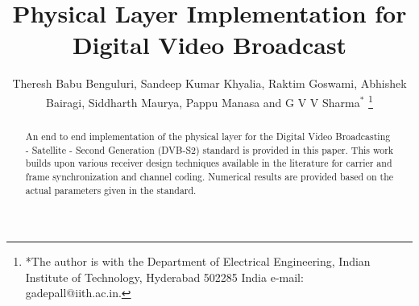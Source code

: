 \documentclass[journal,12pt,twocolumn]{IEEEtran}
\begin{document}


\let\StandardTheFigure\thefigure
\let\StandardTheTable\thetable





\def\putbox#1#2#3{\makebox[0in][l]{\makebox[#1][l]{}\raisebox{\baselineskip}[0in][0in]{\raisebox{#2}[0in][0in]{#3}}}}
     \def\rightbox#1{\makebox[0in][r]{#1}}
     \def\centbox#1{\makebox[0in]{#1}}
     \def\topbox#1{\raisebox{-\baselineskip}[0in][0in]{#1}}
     \def\midbox#1{\raisebox{-0.5\baselineskip}[0in][0in]{#1}}




\title{ 
Physical Layer Implementation for Digital Video Broadcast
}



\author{Theresh Babu Benguluri, Sandeep Kumar Khyalia, Raktim Goswami, Abhishek Bairagi, Siddharth Maurya, Pappu Manasa and G V V 
Sharma$^{*}$%
\thanks{*The author is with the Department
of Electrical Engineering, Indian Institute of Technology, Hyderabad
502285 India e-mail:  gadepall@iith.ac.in.}
}


\maketitle

\tableofcontents

\bigskip
%
\begin{abstract}
An end to end implementation of the physical layer for the Digital Video Broadcasting - Satellite - Second Generation (DVB-S2) standard is provided in this paper.  This work builds upon various receiver design techniques available in the literature for carrier and frame synchronization and channel coding.  Numerical results are provided based on the actual parameters given in the standard.
\end{abstract}
\end{document}
